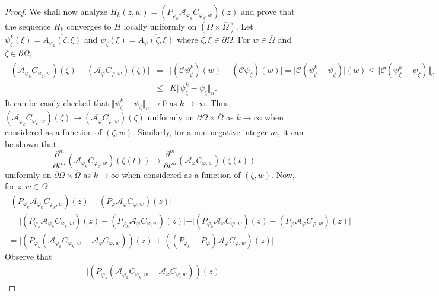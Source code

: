 \documentclass[11pt, reqno]{amsart}
\numberwithin{equation}{section}
\begin{document}
\begin{proof}
\medskip

We shall now analyze $H_k(z,w)=(P_{\varphi_k} \mathcal{A}_{\varphi_k} C_{\varphi_k,w})(z)$ and prove that the sequence $H_k$ converges to $H$ locally uniformly on $(\Omega\times\overline{\Omega})$. Let $\psi_{\zeta}^k(\xi)=\overline{A_{\varphi_k}(\zeta,\xi)}$ and $\psi_{\zeta}(\xi)=\overline{A_{\varphi}(\zeta,\xi)}$ where $\zeta,\xi\in\partial\Omega$. For $w\in\overline{\Omega}$ and $\zeta\in\partial\Omega$,
\begin{eqnarray*}
\vert(\mathcal{A}_{\varphi_k}C_{\varphi_k,w})(\zeta)-(\mathcal{A}_{\varphi}C_{\varphi,w})(\zeta)\vert 
&=&
\vert\overline{(\mathcal{C}\psi^k_{\zeta})(w)}-\overline{(\mathcal{C}\psi_{\zeta})(w)}\vert
=
\vert\mathcal{C}(\psi^k_{\zeta}-\psi_{\zeta})\vert(w)
\leq
\Vert\mathcal{C}(\psi^k_{\zeta}-\psi_{\zeta})\Vert_0\\
&\leq&
K\Vert \psi^k_{\zeta}-\psi_{\zeta}\Vert_n.
\end{eqnarray*}
It can be easily checked that $\Vert \psi^k_{\zeta}-\psi_{\zeta}\Vert_n\rightarrow 0$ as $k\rightarrow\infty$. Thus, $(\mathcal{A}_{\varphi_k}C_{\varphi_k,w})(\zeta)\rightarrow (\mathcal{A}_{\varphi}C_{\varphi,w})(\zeta)$ uniformly on $\partial\Omega\times \overline{\Omega}$ as $k\rightarrow\infty$ when considered as a function of $(\zeta,w)$. Similarly, for a non-negative integer $m$, it can be shown that
\[
\frac{\partial^m}{\partial t^m} (\mathcal{A}_{\varphi_k}C_{\varphi_k,w})(\zeta(t))
\rightarrow
\frac{\partial^m}{\partial t^m}(\mathcal{A}_{\varphi}C_{\varphi,w})(\zeta(t))
\]
uniformly on $\partial\Omega\times \overline{\Omega}$ as $k\rightarrow\infty$ when considered as a function of $(\zeta,w)$. Now, for $z,w\in\overline{\Omega}$
\begin{multline*}
\vert (P_{\varphi_k}\mathcal{A}_{\varphi_k} C_{\varphi_k,w})(z)-(P_{\varphi}\mathcal{A}_{\varphi} C_{\varphi,w})(z)\vert
\\
=
\vert (P_{\varphi_k}\mathcal{A}_{\varphi_k} C_{\varphi_k,w})(z)-(P_{\varphi_k}\mathcal{A}_{\varphi} C_{\varphi,w})(z)\vert 
+
\vert (P_{\varphi_k}\mathcal{A}_{\varphi} C_{\varphi,w})(z)-(P_{\varphi}\mathcal{A}_{\varphi} C_{\varphi,w})(z)\vert\\
=
\vert (P_{\varphi_k}(\mathcal{A}_{\varphi_k} C_{\varphi_k,w}-\mathcal{A}_{\varphi} C_{\varphi,w}))(z)\vert 
+
\vert ((P_{\varphi_k}-P_{\varphi})\mathcal{A}_{\varphi} C_{\varphi,w})(z)\vert.
\end{multline*}
Observe that
\begin{eqnarray*}
\vert (P_{\varphi_k}(\mathcal{A}_{\varphi_k} C_{\varphi_k,w}-\mathcal{A}_{\varphi} C_{\varphi,w}))(z)\vert 

\end{eqnarray*}
\end{proof}
\end{document}
